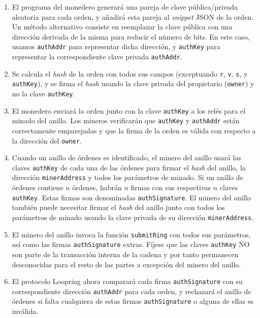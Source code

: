 \documentclass[UTF8,nofonts]{article}
\begin{document}
\begin{multicols}{2}
\begin{enumerate}
	\item El programa del monedero generará una pareja de clave pública/privada aleatoria para cada orden, y añadirá esta pareja al \textit{snippet} JSON de la orden. Un método alternativo consiste en reemplazar la clave pública con una dirección derivada de la misma para reducir el número de bits. En este caso, usamos \verb|authAddr| para representar dicha dirección, y \verb|authKey| para representar la correspondiente clave privada \verb|authAddr|.

	\item Se calcula el \textit{hash} de la orden con todos sus campos (exceptuando \verb|r|, \verb|v|, \verb|s|, y \verb|authKey|), y se firma el \textit{hash} usando la clave privada del propietario (\verb|owner|) y no la clave \verb|authKey|.

	\item El monedero enviará la orden junto con la clave \verb|authKey| a los relés para el minado del anillo. Los mineros verificarán que \verb|authKey| y \verb|authAddr| están correctamente emparejadas y que la firma de la orden es válida con respecto a la dirección del \verb|owner|.

	\item Cuando un anillo de órdenes es identificado, el minero del anillo usará las claves \verb|authKey| de cada una de las órdenes para firmar el \textit{hash} del anillo, la dirección \verb|minerAddress| y todos los parámetros de minado. Si un anillo de órdenes contiene $n$ órdenes, habrán $n$ firmas con sus respectivas $n$ claves \verb|authKey|. Estas firmas son denominadas \verb|authSignature|. El minero del anillo también puede necesitar firmar el \textit{hash} del anillo junto con todos los parámetros de minado usando la clave privada de su dirección \verb|minerAddress|.

	\item El minero del anillo invoca la función \verb|submitRing| con todos sus parámetros, así como las firmas \verb|authSignature| extras. Fíjese que las claves \verb|authKey| NO son parte de la transacción interna de la cadena y por tanto permanecen desconocidas para el resto de las partes a excepción del minero del anillo.


	\item El protocolo Loopring ahora comparará cada firma \verb|authSignature| con su correspondiente dirección \verb|authAddr| para cada orden, y rechazará el anillo de órdenes si falta cualquiera de estas firmas \verb|authSignature| o alguna de ellas es inválida.
 

\end{enumerate}
\end{multicols}
\end{document}
